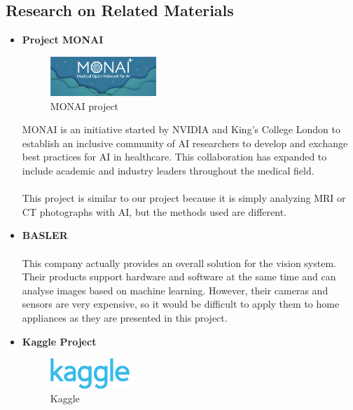 \subsection{\textbf{Research on Related Materials}\\}
\begin{itemize}
    \item \textbf{Project MONAI}\\
    
    \begin{figure}[htp]
    \centering
    \includegraphics[width=4cm]{images/monai.png}
    \caption{MONAI project}
    \label{fig:monai}
    \end{figure}
    
    MONAI is an initiative started by NVIDIA and King's College London to establish an inclusive community of AI researchers to develop and exchange best practices for AI in healthcare. This collaboration has expanded to include academic and industry leaders throughout the medical field.\\ \\This project is similar to our project because it is simply analyzing MRI or CT photographs with AI, but the methods used are different.\\
    \item \textbf{BASLER}\\
    \\This company actually provides an overall solution for the vision system. Their products support hardware and software at the same time and can analyse images based on machine learning. However, their cameras and sensors are very expensive, so it would be difficult to apply them to home appliances as they are presented in this project.\\
    \item \textbf{Kaggle Project}\\

    \begin{figure}[htp]
    \centering
    \includegraphics[width=3cm]{images/kaggle.png}
    \caption{Kaggle}
    \label{fig:kaggle}
    \end{figure}
    

\end{itemize}
